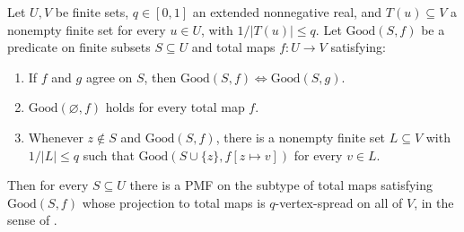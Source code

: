\begin{lemma}
Let $U,V$ be finite sets, $q\in[0,1]$ an extended nonnegative real,
and $T(u)\subseteq V$ a nonempty finite set for every $u\in U$,
with $1/|T(u)|\leq q$. Let $\mathrm{Good}(S,f)$ be a predicate on
finite subsets $S\subseteq U$ and total maps $f:U\to V$ satisfying:
\begin{enumerate}
\item If $f$ and $g$ agree on $S$, then
$\mathrm{Good}(S,f)\Longleftrightarrow\mathrm{Good}(S,g)$.
\item $\mathrm{Good}(\varnothing,f)$ holds for every total map $f$.
\item Whenever $z\notin S$ and $\mathrm{Good}(S,f)$, there is a
nonempty finite set $L\subseteq V$ with $1/|L|\leq q$ such that
$\mathrm{Good}(S\cup\{z\},f[z\mapsto v])$ for every $v\in L$.
\end{enumerate}
Then for every $S\subseteq U$ there is a PMF on the subtype of total
maps satisfying $\mathrm{Good}(S,f)$ whose projection to total maps
is $q$-vertex-spread on all of $V$, in the sense of
.
\end{lemma}
